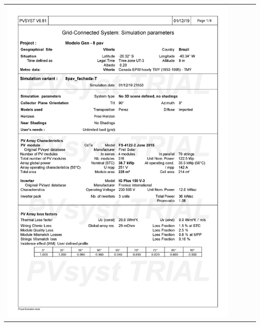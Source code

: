 \begin{table}[H]
    \centering
    \begin{tabular}{l}
        \includegraphics[width=0.9\textwidth]{figures/attachments/resultpv11.jpg}
    \end{tabular}
\end{table}
\pagebreak
